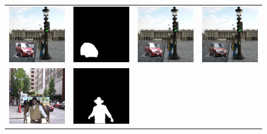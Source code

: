 \begin{figure}[!ht]
\centering
\small
\setlength\tabcolsep{1pt}
\begin{tabular}{cccc}
  \includegraphics[width=.25\textwidth]{figures/guided/000000026204_input.jpg}&
  \includegraphics[width=.25\textwidth]{figures/guided/000000026204_mask.jpg}&
  \includegraphics[width=.25\textwidth]{figures/guided/000000026204_inpainting.jpg}&
  \includegraphics[width=.25\textwidth]{figures/guided/000000026204_inpainting_harmonization.jpg} \\
  \includegraphics[width=.25\textwidth]{figures/guided/000000488251_input.jpg}&
  \includegraphics[width=.25\textwidth]{figures/guided/000000488251_mask.jpg}&

\end{tabular}
\end{figure}
